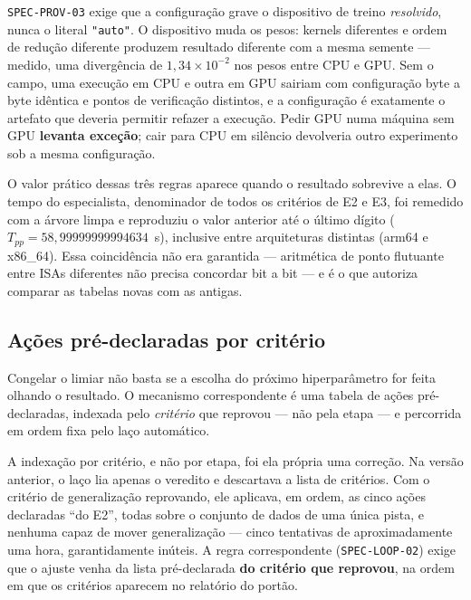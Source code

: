 \texttt{SPEC-PROV-03} exige que a configuração grave o dispositivo de treino
\textit{resolvido}, nunca o literal \texttt{"auto"}. O dispositivo muda os pesos:
kernels diferentes e ordem de redução diferente produzem resultado diferente com
a mesma semente --- medido, uma divergência de $1{,}34 \times 10^{-2}$ nos pesos
entre CPU e GPU. Sem o campo, uma execução em CPU e outra em GPU sairiam com
configuração byte a byte idêntica e pontos de verificação distintos, e a
configuração é exatamente o artefato que deveria permitir refazer a execução.
Pedir GPU numa máquina sem GPU \textbf{levanta exceção}; cair para CPU em
silêncio devolveria outro experimento sob a mesma configuração.

O valor prático dessas três regras aparece quando o resultado sobrevive a elas. O
tempo do especialista, denominador de todos os critérios de E2 e E3, foi
remedido com a árvore limpa e reproduziu o valor anterior até o último dígito
($T_{pp} = 58{,}99999999994634$~s), inclusive entre arquiteturas distintas
(arm64 e x86\_64). Essa coincidência não era garantida --- aritmética de ponto
flutuante entre ISAs diferentes não precisa concordar bit a bit --- e é o que
autoriza comparar as tabelas novas com as antigas.

\subsection{Ações pré-declaradas por critério}

Congelar o limiar não basta se a escolha do próximo hiperparâmetro for feita
olhando o resultado. O mecanismo correspondente é uma tabela de ações
pré-declaradas, indexada pelo \textit{critério} que reprovou --- não pela etapa
--- e percorrida em ordem fixa pelo laço automático.

A indexação por critério, e não por etapa, foi ela própria uma correção. Na
versão anterior, o laço lia apenas o veredito e descartava a lista de critérios.
Com o critério de generalização reprovando, ele aplicava, em ordem, as cinco
ações declaradas ``do E2'', todas sobre o conjunto de dados de uma única pista, e
nenhuma capaz de mover generalização --- cinco tentativas de aproximadamente uma
hora, garantidamente inúteis. A regra correspondente
(\texttt{SPEC-LOOP-02}) exige que o ajuste venha da lista pré-declarada
\textbf{do critério que reprovou}, na ordem em que os critérios aparecem no
relatório do portão.

